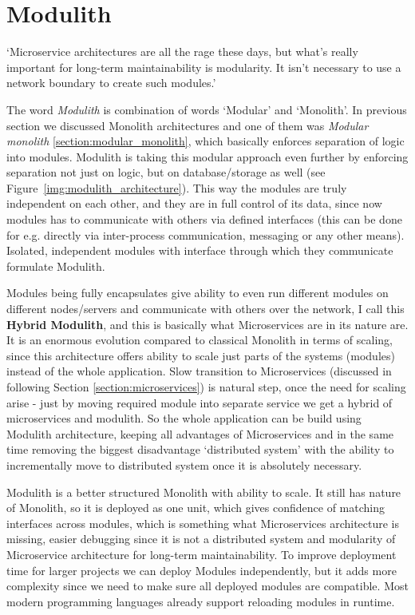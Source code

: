 \section{Modulith}
\label{section:modulith}
`Microservice architectures are all the rage these days, but what's really important for long-term maintainability is modularity. It isn't necessary to use a network boundary to create such modules.' \cite{HOW_TO_BUILD_MODULAR_MONOLITH_CONFERENCE_INTRO}

The word \textit{Modulith} is combination of words `Modular' and `Monolith'. In previous section we discussed Monolith architectures and one of them was \textit{Modular monolith} \ref{section:modular_monolith}, which basically enforces separation of logic into modules. Modulith is taking this modular approach even further by enforcing separation not just on logic, but on database/storage as well (see Figure~\ref{img:modulith_architecture}). This way the modules are truly independent on each other, and they are in full control of its data, since now modules has to communicate with others via defined interfaces (this can be done for e.g. directly via inter-process communication, messaging or any other means). Isolated, independent modules with interface through which they communicate formulate Modulith.

Modules being fully encapsulates give ability to even run different modules on different nodes/servers and communicate with others over the network, I call this \textbf{Hybrid Modulith}, and this is basically what Microservices are in its nature are. It is an enormous evolution compared to classical Monolith in terms of scaling, since this architecture offers ability to scale just parts of the systems (modules) instead of the whole application. Slow transition to Microservices (discussed in following Section \ref{section:microservices}) is natural step, once the need for scaling arise - just by moving required module into separate service we get a hybrid of microservices and modulith. So the whole application can be build using Modulith architecture, keeping all advantages of Microservices and in the same time removing the biggest disadvantage `distributed system' with the ability to incrementally move to distributed system once it is absolutely necessary.

Modulith is a better structured Monolith with ability to scale. It still has nature of Monolith, so it is deployed as one unit, which gives confidence of matching interfaces across modules, which is something what Microservices architecture is missing, easier debugging since it is not a distributed system and modularity of Microservice architecture for long-term maintainability. To improve deployment time for larger projects we can deploy Modules independently, but it adds more complexity since we need to make sure all deployed modules are compatible. Most modern programming languages already support reloading modules in runtime.

